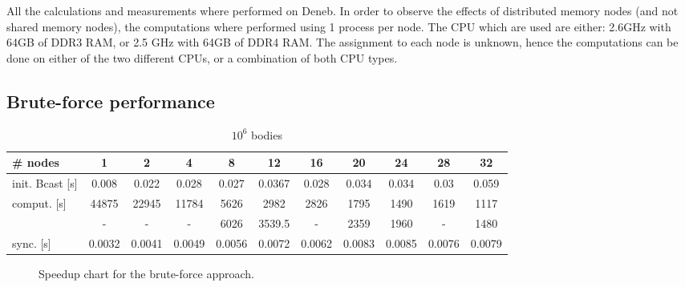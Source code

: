 All the calculations and measurements where performed on Deneb. In order to observe the effects of distributed memory nodes (and not shared memory nodes), the computations where performed using 1 process per node. The CPU which are used are either: 2.6GHz with 64GB of DDR3 RAM, or 2.5 GHz with 64GB of DDR4 RAM. The assignment to each node is unknown, hence the computations can be done on either of the two different CPUs, or a combination of both CPU types.

\subsection{Brute-force performance}

\begin{table}[H]
  \begin{adjustwidth}{-1.5cm}{-1.5cm}   
    \centering
    \begin{tabular}{l|cccccccccc}
      \# nodes & 1 & 2 & 4 & 8 & 12 & 16 & 20 & 24 & 28 & 32\\
      \hline init. Bcast [s] & 0.008 & 0.022 & 0.028 & 0.027 & 0.0367 & 0.028 & 0.034 & 0.034 & 0.03 & 0.059\\
      comput. [s] & 44875 & 22945 & 11784 & 5626 & 2982 & 2826 & 1795 & 1490 & 1619 & 1117\\
      & - & - & - & 6026 & 3539.5 & - & 2359 & 1960 & - & 1480\\
      sync. [s] & 0.0032 & 0.0041 & 0.0049 & 0.0056 & 0.0072 & 0.0062 & 0.0083 & 0.0085 & 0.0076& 0.0079\\
    \end{tabular}
    \caption{$10^6$ bodies}
    \label{tab:bf:10e6}
  \end{adjustwidth}
\end{table}

\begin{figure}[H]

\caption{Speedup chart for the brute-force approach.}
\end{figure}



